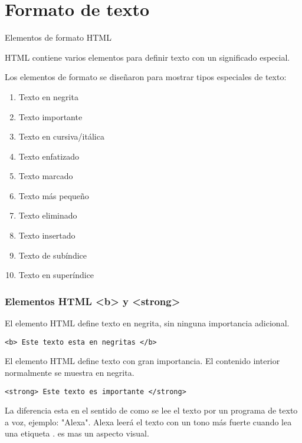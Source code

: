 
\section{Formato de texto}

\begin{frame}[c]{Elementos de formato HTML}

  HTML contiene varios elementos para definir texto con
  un significado especial.

  \vspace{\baselineskip}
  Los elementos de formato se diseñaron para mostrar tipos
  especiales de texto:

  \vspace{\baselineskip}
  \begin{enumerate}
    \item {} Texto en negrita
    \item {} Texto importante
    \item {} Texto en cursiva/itálica
    \item {} Texto enfatizado
    \item {} Texto marcado
    \item {} Texto más pequeño
    \item {} Texto eliminado
    \item {} Texto insertado
    \item {} Texto de subíndice
    \item {} Texto en superíndice
  \end{enumerate}
\end{frame}

\begin{frame}[fragile]
  \frametitle{Elementos HTML <b> y <strong>}

  El elemento HTML  define texto en negrita,
  sin ninguna importancia adicional.

  \begin{lstlisting}
<b> Este texto esta en negritas </b>
  \end{lstlisting}

  \vspace{\baselineskip}
  El elemento HTML  define texto con gran importancia.
  El contenido interior normalmente se muestra en negrita.

  \begin{lstlisting}
<strong> Este texto es importante </strong>
  \end{lstlisting}

  \vspace{\baselineskip}
  La diferencia esta en el sentido de como se lee el texto por un programa
  de texto a voz, ejemplo: "Alexa". Alexa leerá el texto con un tono más
  fuerte cuando lea una etiqueta .  es mas un aspecto
  visual.
\end{frame}

